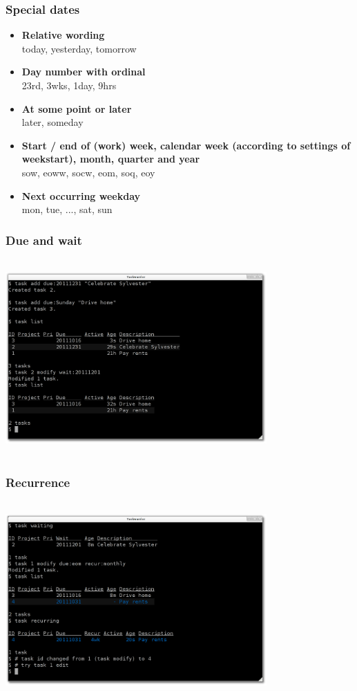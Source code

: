 \documentclass[t,handout]{beamer}
\begin{document}
\begin{frame}
\frametitle{Special dates}
\begin{itemize}
\item \textbf{Relative wording} \\ today, yesterday, tomorrow
\item \textbf{Day number with ordinal} \\ 23rd, 3wks, 1day, 9hrs
\item \textbf{At some point or later} \\ later, someday
\item \textbf{Start / end of (work) week, calendar week (according to settings of weekstart), month, quarter and year} \\ sow, eoww, socw, eom, soq, eoy
\item \textbf{Next occurring weekday} \\ mon, tue, ..., sat, sun
\end{itemize}
\end{frame}

\begin{frame}
\frametitle{Due and wait}
\begin{center}
\includegraphics[width=10cm,height=7.5cm]{due_and_wait.png}
\end{center}
\end{frame}

\begin{frame}
\frametitle{Recurrence}
\begin{center}
\includegraphics[width=10cm,height=7.5cm]{recur.png}
\end{center}
\end{frame}
\end{document}
